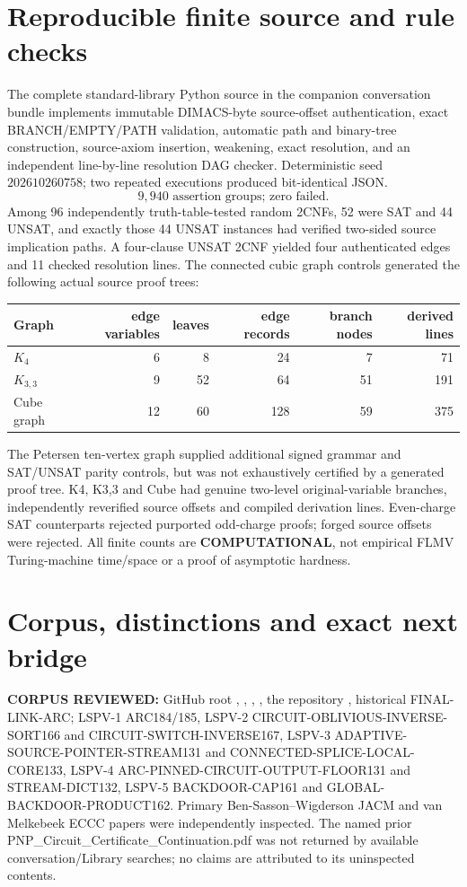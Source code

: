 \documentclass[11pt]{article}
\begin{document}
\section{Reproducible finite source and rule checks}
The complete standard-library Python source in the companion conversation bundle implements immutable DIMACS-byte source-offset authentication, exact BRANCH/EMPTY/PATH validation, automatic path and binary-tree construction, source-axiom insertion, weakening, exact resolution, and an independent line-by-line resolution DAG checker. Deterministic seed \(202610260758\); two repeated executions produced bit-identical JSON.
\[
\boxed{9{,}940\text{ assertion groups; zero failed.}}
\]
Among 96 independently truth-table-tested random 2CNFs, 52 were SAT and 44 UNSAT, and exactly those 44 UNSAT instances had verified two-sided source implication paths. A four-clause UNSAT 2CNF yielded four authenticated edges and 11 checked resolution lines. The connected cubic graph controls generated the following actual source proof trees:
\begin{center}\begin{tabular}{lrrrrr}\toprule
Graph & edge variables & leaves & edge records & branch nodes & derived lines\\\midrule
\(K_4\)&6&8&24&7&71\\
\(K_{3,3}\)&9&52&64&51&191\\
Cube graph&12&60&128&59&375\\\bottomrule\end{tabular}\end{center}
The Petersen ten-vertex graph supplied additional signed grammar and SAT/UNSAT parity controls, but was not exhaustively certified by a generated proof tree. K4, K3,3 and Cube had genuine two-level original-variable branches, independently reverified source offsets and compiled derivation lines. Even-charge SAT counterparts rejected purported odd-charge proofs; forged source offsets were rejected. All finite counts are \textbf{COMPUTATIONAL}, not empirical FLMV Turing-machine time/space or a proof of asymptotic hardness.

\section{Corpus, distinctions and exact next bridge}
\noindent\textbf{CORPUS REVIEWED:} GitHub root , , , , the repository , historical FINAL-LINK-ARC; LSPV-1 ARC184/185, LSPV-2 CIRCUIT-OBLIVIOUS-INVERSE-SORT166 and CIRCUIT-SWITCH-INVERSE167, LSPV-3 ADAPTIVE-SOURCE-POINTER-STREAM131 and CONNECTED-SPLICE-LOCAL-CORE133, LSPV-4 ARC-PINNED-CIRCUIT-OUTPUT-FLOOR131 and STREAM-DICT132, LSPV-5 BACKDOOR-CAP161 and GLOBAL-BACKDOOR-PRODUCT162. Primary Ben-Sasson--Wigderson JACM and van Melkebeek ECCC papers were independently inspected. The named prior PNP\_Circuit\_Certificate\_Continuation.pdf was not returned by available conversation/Library searches; no claims are attributed to its uninspected contents.
\end{document}
